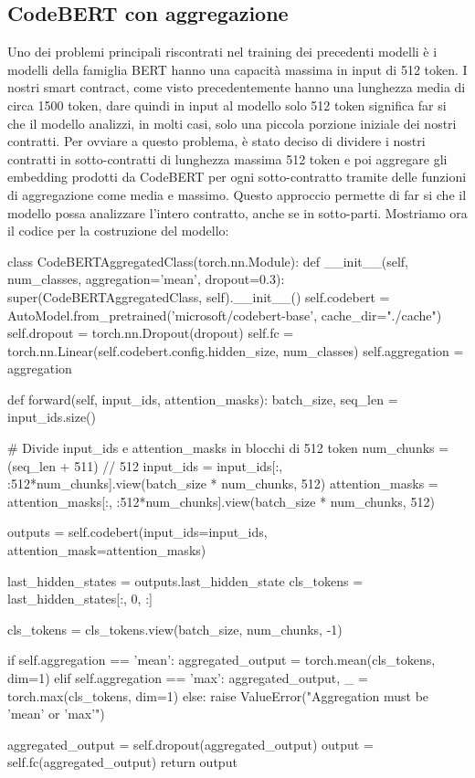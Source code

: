 \documentclass[../../Thesis.tex]{subfiles}
\begin{document}
\subsection{CodeBERT con aggregazione}
Uno dei problemi principali riscontrati nel training dei precedenti modelli è i modelli della famiglia BERT hanno una capacità massima in input di 512 token. I nostri smart contract, come visto precedentemente hanno una lunghezza media di circa 1500 token, dare quindi in input al modello solo 512 token significa far si che il modello analizzi, in molti casi, solo una piccola porzione iniziale dei nostri contratti. Per ovviare a questo problema, è stato deciso di dividere i nostri contratti in sotto-contratti di lunghezza massima 512 token e poi aggregare gli embedding prodotti da CodeBERT per ogni sotto-contratto tramite delle funzioni di aggregazione come media e massimo. Questo approccio permette di far si che il modello possa analizzare l'intero contratto, anche se in sotto-parti. Mostriamo ora il codice per la costruzione del modello: 
\begin{python}
    class CodeBERTAggregatedClass(torch.nn.Module):
        def __init__(self, num_classes, aggregation='mean', dropout=0.3):
            super(CodeBERTAggregatedClass, self).__init__()
            self.codebert = AutoModel.from_pretrained('microsoft/codebert-base', cache_dir="./cache")
            self.dropout = torch.nn.Dropout(dropout)
            self.fc = torch.nn.Linear(self.codebert.config.hidden_size, num_classes)
            self.aggregation = aggregation

        def forward(self, input_ids, attention_masks):
            batch_size, seq_len = input_ids.size()

            # Divide input_ids e attention_masks in blocchi di 512 token
            num_chunks = (seq_len + 511) // 512
            input_ids = input_ids[:, :512*num_chunks].view(batch_size * num_chunks, 512)
            attention_masks = attention_masks[:, :512*num_chunks].view(batch_size * num_chunks, 512)

            outputs = self.codebert(input_ids=input_ids, attention_mask=attention_masks)

            last_hidden_states = outputs.last_hidden_state
            cls_tokens = last_hidden_states[:, 0, :]

            cls_tokens = cls_tokens.view(batch_size, num_chunks, -1)

            if self.aggregation == 'mean':
                aggregated_output = torch.mean(cls_tokens, dim=1)
            elif self.aggregation == 'max':
                aggregated_output, _ = torch.max(cls_tokens, dim=1)
            else:
                raise ValueError("Aggregation must be 'mean' or 'max'")

            aggregated_output = self.dropout(aggregated_output)
            output = self.fc(aggregated_output)
            return output
\end{python}
\end{document}
